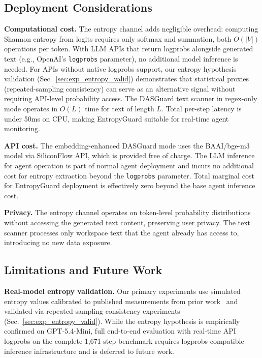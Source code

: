 \documentclass[conference]{IEEEtran}
\begin{document}
\subsection{Deployment Considerations}

\textbf{Computational cost.} The entropy channel adds negligible overhead: computing Shannon entropy from logits requires only softmax and summation, both $O(|V|)$ operations per token. With LLM APIs that return logprobs alongside generated text (e.g., OpenAI's \texttt{logprobs} parameter), no additional model inference is needed. For APIs without native logprobs support, our entropy hypothesis validation (Sec.~\ref{sec:exp_entropy_valid}) demonstrates that statistical proxies (repeated-sampling consistency) can serve as an alternative signal without requiring API-level probability access. The DASGuard text scanner in regex-only mode operates in $O(L)$ time for text of length $L$. Total per-step latency is under 50ms on CPU, making EntropyGuard suitable for real-time agent monitoring.

\textbf{API cost.} The embedding-enhanced DASGuard mode uses the BAAI/bge-m3 model via SiliconFlow API, which is provided free of charge. The LLM inference for agent operation is part of normal agent deployment and incurs no additional cost for entropy extraction beyond the \texttt{logprobs} parameter. Total marginal cost for EntropyGuard deployment is effectively zero beyond the base agent inference cost.

\textbf{Privacy.} The entropy channel operates on token-level probability distributions without accessing the generated text content, preserving user privacy. The text scanner processes only workspace text that the agent already has access to, introducing no new data exposure.

\subsection{Limitations and Future Work}

\textbf{Real-model entropy validation.} Our primary experiments use simulated entropy values calibrated to published measurements from prior work~\cite{li2025dualsentinel} and validated via repeated-sampling consistency experiments (Sec.~\ref{sec:exp_entropy_valid}). While the entropy hypothesis is empirically confirmed on GPT-5.4-Mini, full end-to-end evaluation with real-time API logprobs on the complete 1,671-step benchmark requires logprobs-compatible inference infrastructure and is deferred to future work.
\end{document}
